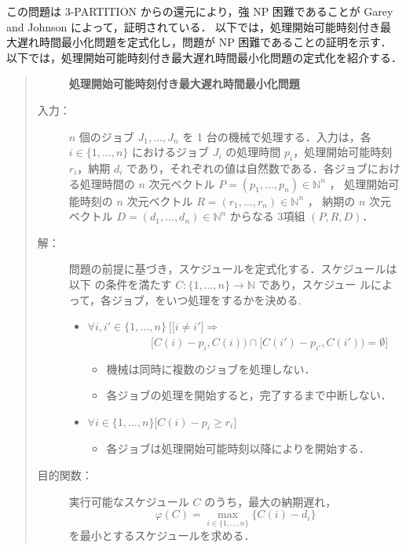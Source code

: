 \documentclass[12pt]{optlab-bachelor}
\begin{document}
この問題は \textsc{3-PARTITION} からの還元により，強 NP 困難であることが Garey and Johnson \cite{3SAT}によって，証明されている．
以下では，処理開始可能時刻付き最大遅れ時間最小化問題を定式化し，問題が NP 困難であることの証明を示す．
以下では，処理開始可能時刻付き最大遅れ時間最小化問題の定式化を紹介する．
\begin{quote}
  \begin{description}
    \item[] {\bf 処理開始可能時刻付き最大遅れ時間最小化問題}
    \item[入力：] $n$ 個のジョブ $J_1,\ldots,J_n$ を 1 台の機械で処理する．入力は，各 $i \in \{1,\ldots,n\}$ におけるジョブ $J_i$ の処理時間 $p_i$，処理開始可能時刻
    $r_i$，納期 $d_i$ であり，それぞれの値は自然数である．各ジョブにおける処理時間の $n$ 次元ベクトル $P = (p_1,\ldots,p_n) \in \mathbb{N}^n$ ，
    処理開始可能時刻の $n$ 次元ベクトル $R = (r_1,\ldots,r_n) \in \mathbb{N}^n$ ，
    納期の $n$ 次元ベクトル $D = (d_1,\ldots,d_n) \in \mathbb{N}^n$ からなる 3項組 $(P,R,D)$．
    \item[解：] 問題の前提に基づき，スケジュールを定式化する．スケジュールは以下
    の条件を満たす $C : \{1,\ldots,n\} \to \mathbb{N}$ であり，スケジュー
    ルによって，各ジョブ，をいつ処理をするかを決める.
    \begin{itemize}
      \item $\forall i, i' \in \{1,\ldots,n\}\ \Big[ \big[i \neq i' \big] \Rightarrow$ \\ $~~~~~~~~~~~~~~~~~~~~~~~~~~[C(i) - p_i, C(i)) \cap [C(i') - p_{i'}, C(i')) = \emptyset \Big]$
      \begin{itemize}
        \item 機械は同時に複数のジョブを処理しない．
        \item 各ジョブの処理を開始すると，完了するまで中断しない．
      \end{itemize}
      \item  $\forall i \in \{1,\ldots,n\}\big[C(i) - p_i \ge r_i\big]$
      \begin{itemize}
        \item 各ジョブは処理開始可能時刻以降によりを開始する．
      \end{itemize}
    \end{itemize}
    \item[目的関数：] 実行可能なスケジュール $C$ のうち，最大の納期遅れ，
    \begin{displaymath}
      \varphi(C) = \max_{i \in \{1,\ldots,n\}}\{C(i) - d_i\}
    \end{displaymath}
    を最小とするスケジュールを求める．
  \end{description}
\end{quote}
\end{document}
